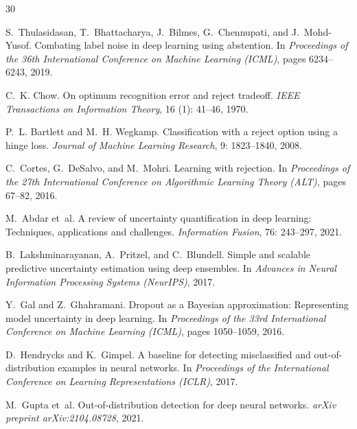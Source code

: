 \documentclass[12pt,a4paper]{article}
\begin{document}
\begin{thebibliography}{30}

S.~Thulasidasan, T.~Bhattacharya, J.~Bilmes, G.~Chennupati, and
  J.~Mohd-Yusof.
\newblock Combating label noise in deep learning using abstention.
\newblock In \emph{Proceedings of the 36th International Conference on Machine
  Learning (ICML)}, pages 6234--6243, 2019.

C.~K. Chow.
\newblock On optimum recognition error and reject tradeoff.
\newblock \emph{IEEE Transactions on Information Theory}, 16
  (1): 41--46, 1970.

P.~L. Bartlett and M.~H. Wegkamp.
\newblock Classification with a reject option using a hinge loss.
\newblock \emph{Journal of Machine Learning Research}, 9: 1823--1840,
  2008.

C.~Cortes, G.~DeSalvo, and M.~Mohri.
\newblock Learning with rejection.
\newblock In \emph{Proceedings of the 27th International Conference on
  Algorithmic Learning Theory (ALT)}, pages 67--82, 2016.

M.~Abdar et~al.
\newblock A review of uncertainty quantification in deep learning: Techniques,
  applications and challenges.
\newblock \emph{Information Fusion}, 76: 243--297, 2021.

B.~Lakshminarayanan, A.~Pritzel, and C.~Blundell.
\newblock Simple and scalable predictive uncertainty estimation using deep
  ensembles.
\newblock In \emph{Advances in Neural Information Processing Systems
  (NeurIPS)}, 2017.

Y.~Gal and Z.~Ghahramani.
\newblock Dropout as a {B}ayesian approximation: Representing model uncertainty
  in deep learning.
\newblock In \emph{Proceedings of the 33rd International Conference on Machine
  Learning (ICML)}, pages 1050--1059, 2016.

D.~Hendrycks and K.~Gimpel.
\newblock A baseline for detecting misclassified and out-of-distribution
  examples in neural networks.
\newblock In \emph{Proceedings of the International Conference on Learning
  Representations (ICLR)}, 2017.

M.~Gupta et~al.
\newblock Out-of-distribution detection for deep neural networks.
\newblock \emph{arXiv preprint arXiv:2104.08728}, 2021.


\end{thebibliography}
\end{document}
